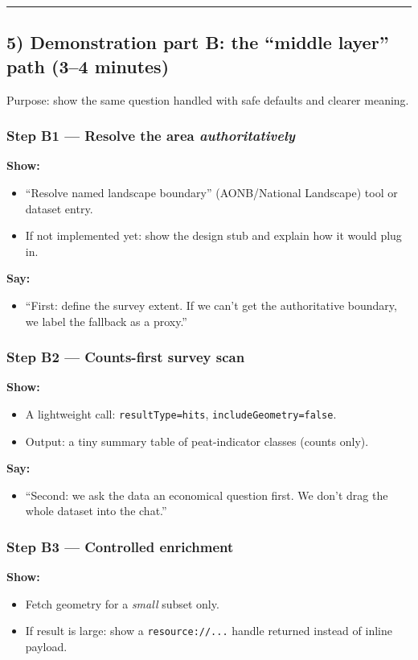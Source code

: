 \par\medskip\hrule\medskip

\subsection{5) Demonstration part B: the “middle layer” path (3–4 minutes)}
Purpose: show the same question handled with safe defaults and clearer meaning.

\subsubsection{Step B1 — Resolve the area \textit{authoritatively}}
\textbf{Show:}
\begin{itemize}[leftmargin=*]
\item “Resolve named landscape boundary” (AONB/National Landscape) tool or dataset entry.
\item If not implemented yet: show the design stub and explain how it would plug in.
\end{itemize}

\textbf{Say:}
\begin{itemize}[leftmargin=*]
\item “First: define the survey extent. If we can’t get the authoritative boundary, we label the fallback as a proxy.”
\end{itemize}

\subsubsection{Step B2 — Counts-first survey scan}
\textbf{Show:}
\begin{itemize}[leftmargin=*]
\item A lightweight call: \texttt{resultType=hits}, \texttt{includeGeometry=false}.
\item Output: a tiny summary table of peat-indicator classes (counts only).
\end{itemize}

\textbf{Say:}
\begin{itemize}[leftmargin=*]
\item “Second: we ask the data an economical question first. We don’t drag the whole dataset into the chat.”
\end{itemize}

\subsubsection{Step B3 — Controlled enrichment}
\textbf{Show:}
\begin{itemize}[leftmargin=*]
\item Fetch geometry for a \textit{small} subset only.
\item If result is large: show a \texttt{resource://...} handle returned instead of inline payload.
\end{itemize}

